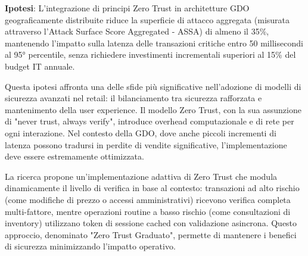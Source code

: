 \textbf{Ipotesi}: L'integrazione di principi Zero Trust in architetture GDO geograficamente distribuite riduce la superficie di attacco aggregata (misurata attraverso l'Attack Surface Score Aggregated - ASSA) di almeno il 35\%, mantenendo l'impatto sulla latenza delle transazioni critiche entro 50 millisecondi al 95° percentile, senza richiedere investimenti incrementali superiori al 15\% del budget IT annuale.

Questa ipotesi affronta una delle sfide più significative nell'adozione di modelli di sicurezza avanzati nel retail: il bilanciamento tra sicurezza rafforzata e mantenimento della user experience. Il modello Zero Trust, con la sua assunzione di "never trust, always verify", introduce overhead computazionale e di rete per ogni interazione. Nel contesto della GDO, dove anche piccoli incrementi di latenza possono tradursi in perdite di vendite significative, l'implementazione deve essere estremamente ottimizzata.

La ricerca propone un'implementazione adattiva di Zero Trust che modula dinamicamente il livello di verifica in base al contesto: transazioni ad alto rischio (come modifiche di prezzo o accessi amministrativi) ricevono verifica completa multi-fattore, mentre operazioni routine a basso rischio (come consultazioni di inventory) utilizzano token di sessione cached con validazione asincrona. Questo approccio, denominato "Zero Trust Graduato", permette di mantenere i benefici di sicurezza minimizzando l'impatto operativo.

